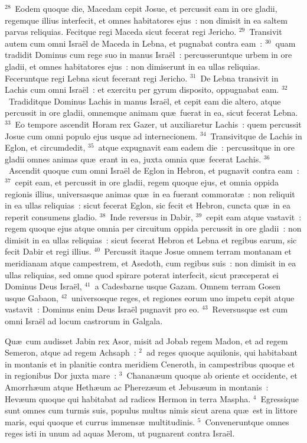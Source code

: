 ${}^{28}$~Eodem quoque die, Macedam cepit Josue, et percussit eam in ore gladii, regemque illius interfecit, et omnes habitatores ejus~: non dimisit in ea saltem parvas reliquias. Fecitque regi Maceda sicut fecerat regi Jericho.
${}^{29}$~Transivit autem cum omni Isra\"el de Maceda in Lebna, et pugnabat contra eam~:
${}^{30}$~quam tradidit Dominus cum rege suo in manus Isra\"el~: percusseruntque urbem in ore gladii, et omnes habitatores ejus~: non dimiserunt in ea ullas reliquias. Feceruntque regi Lebna sicut fecerant regi Jericho.
${}^{31}$~De Lebna transivit in Lachis cum omni Isra\"el~: et exercitu per gyrum disposito, oppugnabat eam.
${}^{32}$~Tradiditque Dominus Lachis in manus Isra\"el, et cepit eam die altero, atque percussit in ore gladii, omnemque animam qu\ae\ fuerat in ea, sicut fecerat Lebna.
${}^{33}$~Eo tempore ascendit Horam rex Gazer, ut auxiliaretur Lachis~: quem percussit Josue cum omni populo ejus usque ad internecionem.
${}^{34}$~Transivitque de Lachis in Eglon, et circumdedit,
${}^{35}$~atque expugnavit eam eadem die~: percussitque in ore gladii omnes animas qu\ae\ erant in ea, juxta omnia qu\ae\ fecerat Lachis.
${}^{36}$~Ascendit quoque cum omni Isra\"el de Eglon in Hebron, et pugnavit contra eam~:
${}^{37}$~cepit eam, et percussit in ore gladii, regem quoque ejus, et omnia oppida regionis illius, universasque animas qu\ae\ in ea fuerant commorat\ae~: non reliquit in ea ullas reliquias~: sicut fecerat Eglon, sic fecit et Hebron, cuncta qu\ae\ in ea reperit consumens gladio.
${}^{38}$~Inde reversus in Dabir,
${}^{39}$~cepit eam atque vastavit~: regem quoque ejus atque omnia per circuitum oppida percussit in ore gladii~: non dimisit in ea ullas reliquias~: sicut fecerat Hebron et Lebna et regibus earum, sic fecit Dabir et regi illius.
${}^{40}$~Percussit itaque Josue omnem terram montanam et meridianam atque campestrem, et Asedoth, cum regibus suis~: non dimisit in ea ullas reliquias, sed omne quod spirare poterat interfecit, sicut pr\ae ceperat ei Dominus Deus Isra\"el,
${}^{41}$~a Cadesbarne usque Gazam. Omnem terram Gosen usque Gabaon,
${}^{42}$~universosque reges, et regiones eorum uno impetu cepit atque vastavit~: Dominus enim Deus Isra\"el pugnavit pro eo.
${}^{43}$~Reversusque est cum omni Isra\"el ad locum castrorum in Galgala.

\lettrine[lines=3,image=true,loversize=0.05,lraise=-0.03]{Q}{}u\ae\ cum audisset Jabin rex Asor, misit ad Jobab regem Madon, et ad regem Semeron, atque ad regem Achsaph~:
${}^{2}$~ad reges quoque aquilonis, qui habitabant in montanis et in planitie contra meridiem Ceneroth, in campestribus quoque et in regionibus Dor juxta mare~:
${}^{3}$~Chanan\ae um quoque ab oriente et occidente, et Amorrh\ae um atque Heth\ae um ac Pherez\ae um et Jebus\ae um in montanis~: Hev\ae um quoque qui habitabat ad radices Hermon in terra Maspha.
${}^{4}$~Egressique sunt omnes cum turmis suis, populus multus nimis sicut arena qu\ae\ est in littore maris, equi quoque et currus immens\ae\ multitudinis.
${}^{5}$~Conveneruntque omnes reges isti in unum ad aquas Merom, ut pugnarent contra Isra\"el.


